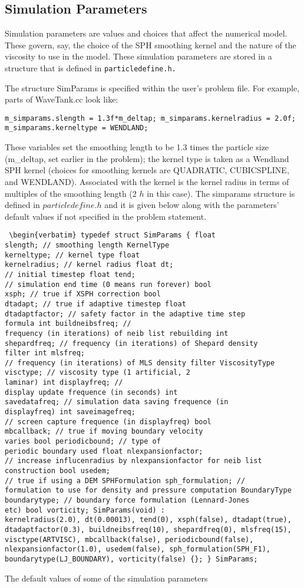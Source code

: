 \documentclass[12pt]{memoir}
\begin{document}
\subsection{Simulation Parameters}

Simulation parameters are values and choices that affect the numerical
model. These govern, say, the choice of the SPH smoothing kernel and
the nature of the viscosity to use in the model. These simulation
parameters are stored in a structure that is defined in
\verb!particledefine.h.!

The structure SimParams is specified within the user's problem file.
For example, parts of WaveTank.cc look like: \begin{verbatim}
m_simparams.slength = 1.3f*m_deltap; m_simparams.kernelradius = 2.0f;
m_simparams.kerneltype = WENDLAND; \end{verbatim} These variables set
the smoothing length to be 1.3 times the particle size (m\_deltap, set
earlier in the problem); the kernel type is taken as a Wendland SPH
kernel \cite{Wendland:2005} (choices for smoothing kernels are
QUADRATIC, CUBICSPLINE, and WENDLAND). Associated with the kernel is
the kernel radius in terms of multiples of the smoothing length (2 $h$
in this case). The simparams structure is defined in
$particledefine.h$ and it is given below along with the parameters'
default values if not specified in the problem statement.
\begin{verbatim} \begin{verbatim} typedef struct SimParams { float
slength; // smoothing length KernelType
kerneltype; // kernel type float
kernelradius; // kernel radius float dt;
// initial timestep float tend;
// simulation end time (0 means run forever) bool
xsph; // true if XSPH correction bool
dtadapt; // true if adaptive timestep float
dtadaptfactor; // safety factor in the adaptive time step
formula int buildneibsfreq; //
frequency (in iterations) of neib list rebuilding int
shepardfreq; // frequency (in iterations) of Shepard density
filter int mlsfreq;
// frequency (in iterations) of MLS density filter ViscosityType
visctype; // viscosity type (1 artificial, 2
laminar) int displayfreq; //
display update frequence (in seconds) int
savedatafreq; // simulation data saving frequence (in
displayfreq) int saveimagefreq;
// screen capture frequence (in displayfreq) bool
mbcallback; // true if moving boundary velocity
varies bool periodicbound; // type of
periodic boundary used float nlexpansionfactor;
// increase influcenradius by nlexpansionfactor for neib list
construction bool usedem;
// true if using a DEM SPHFormulation sph_formulation; //
formulation to use for density and pressure computation BoundaryType
boundarytype; // boundary force formulation (Lennard-Jones
etc) bool vorticity; SimParams(void) :
kernelradius(2.0), dt(0.00013), tend(0), xsph(false), dtadapt(true),
dtadaptfactor(0.3), buildneibsfreq(10), shepardfreq(0), mlsfreq(15),
visctype(ARTVISC), mbcallback(false), periodicbound(false),
nlexpansionfactor(1.0), usedem(false), sph_formulation(SPH_F1),
boundarytype(LJ_BOUNDARY), vorticity(false) {}; } SimParams;

\end{verbatim} The default values of some of the simulation parameters
\end{document}
